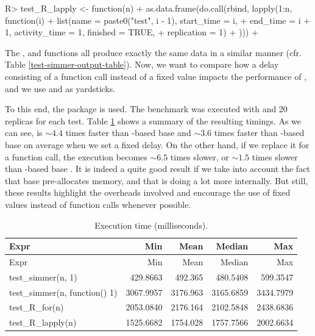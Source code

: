 \documentclass[
  nojss]{jss}
\begin{document}
\begin{CodeChunk}
\begin{CodeInput}
R> test_R_lapply <- function(n) {
+   as.data.frame(do.call(rbind, lapply(1:n, function(i) {
+     list(name = paste0("test", i - 1), start_time = i,
+       end_time = i + 1, activity_time = 1, finished = TRUE,
+       replication = 1)
+   })))
+ }
\end{CodeInput}
\end{CodeChunk}

The ,  and 
functions all produce exactly the same data in a similar manner (cfr.
Table \ref{test-simmer-output-table}). Now, we want to compare how a
delay consisting of a function call instead of a fixed value impacts the
performance of , and we use  and
 as yardsticks.

To this end, the  package
\citep{CRAN:microbenchmark} is used. The benchmark was executed with
 and 20 replicas for each test. Table
\ref{performance-table} shows a summary of the resulting timings. As we
can see,  is \(\sim4.4\) times faster than -based
base  and \(\sim3.6\) times faster than -based
base  on average when we set a fixed delay. On the other
hand, if we replace it for a function call, the execution becomes
\(\sim6.5\) times slower, or \(\sim1.5\) times slower than
-based base . It is indeed a quite good result if
we take into account the fact that base  pre-allocates
memory, and that  is doing a lot more internally. But still,
these results highlight the overheads involved and encourage the use of
fixed values instead of function calls whenever possible.

\begin{longtable}[]{@{}lrrrr@{}}
\caption{Execution time
(milliseconds).\label{performance-table}}\tabularnewline
\toprule
Expr & Min & Mean & Median & Max\tabularnewline
\midrule
\endfirsthead
\toprule
Expr & Min & Mean & Median & Max\tabularnewline
\midrule
\endhead
test\_simmer(n, 1) & 429.8663 & 492.365 & 480.5408 &
599.3547\tabularnewline
test\_simmer(n, function() 1) & 3067.9957 & 3176.963 & 3165.6859 &
3434.7979\tabularnewline
test\_R\_for(n) & 2053.0840 & 2176.164 & 2102.5848 &
2438.6836\tabularnewline
test\_R\_lapply(n) & 1525.6682 & 1754.028 & 1757.7566 &
2002.6634\tabularnewline
\bottomrule
\end{longtable}
\end{document}
